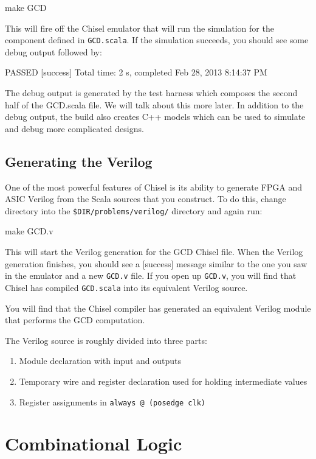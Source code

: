 \documentclass[twocolumn, 10pt]{article}
\begin{document}
\begin{bash}
make GCD
\end{bash}

This will fire off the Chisel emulator that will run the simulation for the component defined in \verb+GCD.scala+. If the simulation succeeds, you should see some debug output followed by:
\begin{bash}
PASSED
[success] Total time: 2 s, completed Feb 28, 2013 8:14:37 PM
\end{bash}

The debug output is generated by the test harness which composes the second half of the GCD.scala file. We will talk about this more later. In addition to the debug output, the build also creates C++ models which can be used to simulate and debug more complicated designs.

\subsection{Generating the Verilog}

One of the most powerful features of Chisel is its ability to generate FPGA and ASIC Verilog from the Scala sources that you construct. To do this, change directory into the \verb+$DIR/problems/verilog/+ directory and again run:
\begin{bash}
make GCD.v
\end{bash}
This will start the Verilog generation for the GCD Chisel file. When the Verilog generation finishes, you should see a [success] message similar to the one you saw in the emulator and a new \verb+GCD.v+ file. If you open up \verb+GCD.v+, you will find that Chisel has compiled \verb+GCD.scala+ into its equivalent Verilog source.

You will find that the Chisel compiler has generated an equivalent Verilog module that performs the GCD computation.

The Verilog source is roughly divided into three parts:
\begin{enumerate}
\item Module declaration with input and outputs
\item Temporary wire and register declaration used for holding intermediate values
\item Register assignments in \verb+always @ (posedge clk)+
\end{enumerate}

\section{Combinational Logic}
\end{document}
